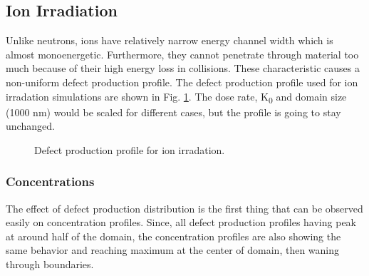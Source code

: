 \documentclass[a4paper]{article}
\begin{document}
  \subsection{Ion Irradiation} \hspace{10pt}
  Unlike neutrons, ions have relatively narrow energy channel width which is almost monoenergetic. Furthermore, they cannot penetrate through material too much because of their high energy loss in collisions. These characteristic causes a non-uniform defect production profile. The defect production profile used for ion irradation simulations are shown in Fig. \ref{figure:defect_production}. The dose rate, K\textsubscript{0} and domain size (1000 nm) would be scaled for different cases, but the profile is going to stay unchanged.
    \begin{figure}[h!]  %
      \centering
      \qquad
      \caption{Defect production profile for ion irradation.}
      \label{figure:defect_production}
    \end{figure}
    \subsubsection{Concentrations} \hspace{10pt}
    The effect of defect production distribution is the first thing that can be observed easily on concentration profiles. Since, all defect production profiles having peak at around half of the domain, the concentration profiles are also showing the same behavior and reaching maximum at the center of domain, then waning through boundaries.
\end{document}
